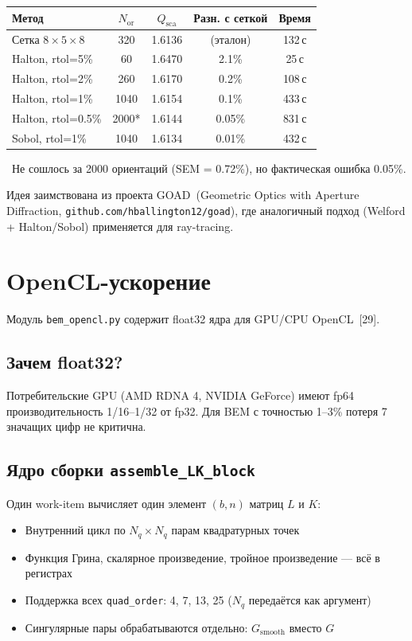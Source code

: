 \documentclass[12pt,a4paper]{article}
\begin{document}
\begin{center}
\begin{tabular}{lcccc}
\toprule
Метод & $N_\mathrm{or}$ & $Q_\mathrm{sca}$ & Разн. с сеткой & Время \\
\midrule
Сетка $8 \times 5 \times 8$ & 320 & 1.6136 & (эталон) & 132\,с \\
Halton, rtol=5\% & 60 & 1.6470 & 2.1\% & 25\,с \\
Halton, rtol=2\% & 260 & 1.6170 & 0.2\% & 108\,с \\
Halton, rtol=1\% & 1040 & 1.6154 & 0.1\% & 433\,с \\
Halton, rtol=0.5\% & 2000* & 1.6144 & 0.05\% & 831\,с \\
Sobol, rtol=1\% & 1040 & 1.6134 & 0.01\% & 432\,с \\
\bottomrule
\end{tabular}
\end{center}

\noindent *~Не сошлось за 2000 ориентаций (SEM = 0.72\%), но фактическая ошибка 0.05\%.

Идея заимствована из проекта GOAD~(Geometric Optics with Aperture Diffraction,
\texttt{github.com/hballington12/goad}), где аналогичный подход
(Welford + Halton/Sobol) применяется для ray-tracing.


\section{OpenCL-ускорение}

Модуль \texttt{bem\_opencl.py} содержит float32 ядра для GPU/CPU OpenCL~[29].

\subsection{Зачем float32?}

Потребительские GPU (AMD RDNA 4, NVIDIA GeForce) имеют fp64 производительность 1/16--1/32 от fp32. Для BEM с точностью 1--3\% потеря 7 значащих цифр не критична.

\subsection{Ядро сборки \texttt{assemble\_LK\_block}}

Один work-item вычисляет один элемент $(b, n)$ матриц $L$ и $K$:
\begin{itemize}
  \item Внутренний цикл по $N_q \times N_q$ парам квадратурных точек
  \item Функция Грина, скалярное произведение, тройное произведение --- всё в регистрах
  \item Поддержка всех \texttt{quad\_order}: 4, 7, 13, 25 ($N_q$ передаётся как аргумент)
  \item Сингулярные пары обрабатываются отдельно: $G_{\mathrm{smooth}}$ вместо $G$
\end{itemize}
\end{document}
